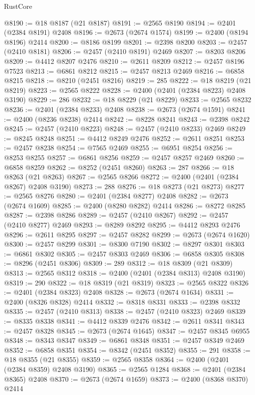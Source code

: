 \begin{lexlean}{RustCore}
\begin{coremodule}
@8190 := @18 @8187 (@21 @8187)
@8191 := @2565 @8190
@8194 := @2401 (@2384 @8191) @2408
@8196 := @2673 (@2674 @1574)
@8199 := @2400 (@8194 @8196) @2414
@8200 := @8186 @8199
@8201 := @2398 @8200
@8203 := @2457 (@2410 @8181)
@8206 := @2457 (@2410 @8191) @2469
@8207 := @8203 @8206
@8209 := @4412 @8207 @2476
@8210 := @2611 @8209
@8212 := @2457 @8196 @7523
@8213 := @6861 @8212
@8215 := @2457 @8213 @2469
@8216 := @6858 @8215
@8218 := @8210 (@2451 @8216)
@8219 := 285
@8222 := @18 @8219 (@21 @8219)
@8223 := @2565 @8222
@8228 := @2400 (@2401 (@2384 @8223) @2408 @3190)
@8229 := 286
@8232 := @18 @8229 (@21 @8229)
@8233 := @2565 @8232
@8236 := @2401 (@2384 @8233) @2408
@8238 := @2673 (@2674 @1591)
@8241 := @2400 (@8236 @8238) @2414
@8242 := @8228 @8241
@8243 := @2398 @8242
@8245 := @2457 (@2410 @8223)
@8248 := @2457 (@2410 @8233) @2469
@8249 := @8245 @8248
@8251 := @4412 @8249 @2476
@8252 := @2611 @8251
@8253 := @2457 @8238
@8254 := @7565 @2469
@8255 := @6951 @8254
@8256 := @8253 @8255
@8257 := @6861 @8256
@8259 := @2457 @8257 @2469
@8260 := @6858 @8259
@8262 := @8252 (@2451 @8260)
@8263 := 287
@8266 := @18 @8263 (@21 @8263)
@8267 := @2565 @8266
@8272 := @2400 (@2401 (@2384 @8267) @2408 @3190)
@8273 := 288
@8276 := @18 @8273 (@21 @8273)
@8277 := @2565 @8276
@8280 := @2401 (@2384 @8277) @2408
@8282 := @2673 (@2674 @1609)
@8285 := @2400 (@8280 @8282) @2414
@8286 := @8272 @8285
@8287 := @2398 @8286
@8289 := @2457 (@2410 @8267)
@8292 := @2457 (@2410 @8277) @2469
@8293 := @8289 @8292
@8295 := @4412 @8293 @2476
@8296 := @2611 @8295
@8297 := @2457 @8282
@8299 := @2673 (@2674 @1620)
@8300 := @2457 @8299
@8301 := @8300 @7190
@8302 := @8297 @8301
@8303 := @6861 @8302
@8305 := @2457 @8303 @2469
@8306 := @6858 @8305
@8308 := @8296 (@2451 @8306)
@8309 := 289
@8312 := @18 @8309 (@21 @8309)
@8313 := @2565 @8312
@8318 := @2400 (@2401 (@2384 @8313) @2408 @3190)
@8319 := 290
@8322 := @18 @8319 (@21 @8319)
@8323 := @2565 @8322
@8326 := @2401 (@2384 @8323) @2408
@8328 := @2673 (@2674 @1634)
@8331 := @2400 (@8326 @8328) @2414
@8332 := @8318 @8331
@8333 := @2398 @8332
@8335 := @2457 (@2410 @8313)
@8338 := @2457 (@2410 @8323) @2469
@8339 := @8335 @8338
@8341 := @4412 @8339 @2476
@8342 := @2611 @8341
@8343 := @2457 @8328
@8345 := @2673 (@2674 @1645)
@8347 := @2457 @8345 @6955
@8348 := @8343 @8347
@8349 := @6861 @8348
@8351 := @2457 @8349 @2469
@8352 := @6858 @8351
@8354 := @8342 (@2451 @8352)
@8355 := 291
@8358 := @18 @8355 (@21 @8355)
@8359 := @2565 @8358
@8364 := @2400 (@2401 (@2384 @8359) @2408 @3190)
@8365 := @2565 @1284
@8368 := @2401 (@2384 @8365) @2408
@8370 := @2673 (@2674 @1659)
@8373 := @2400 (@8368 @8370) @2414

\end{coremodule}
\end{lexlean}
